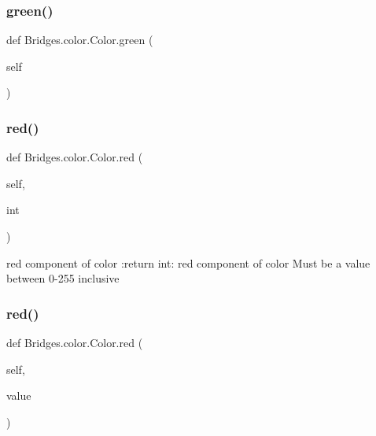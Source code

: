 \subsubsection{\texorpdfstring{green()}{green()}\hspace{0.1cm}{\footnotesize\ttfamily [3/3]}}
{\footnotesize\ttfamily def Bridges.\+color.\+Color.\+green (\begin{DoxyParamCaption}\item[{}]{self }\end{DoxyParamCaption})}

\mbox{\label{class_bridges_1_1color_1_1_color_ae89e14c5811e5bfd8812ea5aae98c60c}} 
\subsubsection{\texorpdfstring{red()}{red()}\hspace{0.1cm}{\footnotesize\ttfamily [1/3]}}
{\footnotesize\ttfamily def Bridges.\+color.\+Color.\+red (\begin{DoxyParamCaption}\item[{}]{self,  }\item[{}]{int }\end{DoxyParamCaption})}

\begin{DoxyVerb}red component of color
:return int: red component of color
Must be a value between 0-255 inclusive
\end{DoxyVerb}
 \mbox{\label{class_bridges_1_1color_1_1_color_adc4ac7f0a6c24c58e83e243a8e4a92f6}} 
\subsubsection{\texorpdfstring{red()}{red()}\hspace{0.1cm}{\footnotesize\ttfamily [2/3]}}
{\footnotesize\ttfamily def Bridges.\+color.\+Color.\+red (\begin{DoxyParamCaption}\item[{}]{self,  }\item[{}]{value }\end{DoxyParamCaption})}

